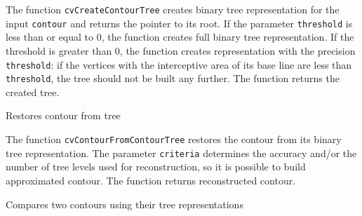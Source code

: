 
\begin{description}
\end{description}

The function \texttt{cvCreateContourTree} creates binary tree representation for the input \texttt{contour} and returns the pointer to its root. If the parameter \texttt{threshold} is less than or equal to 0, the function creates full binary tree representation. If the threshold is greater than 0, the function creates representation with the precision \texttt{threshold}: if the vertices with the interceptive area of its base line are less than \texttt{threshold}, the tree should not be built any further. The function returns the created tree.

\label{ContourFromContourTree}

Restores contour from tree


\begin{description}
\end{description}

The function \texttt{cvContourFromContourTree} restores the contour from its binary tree representation. The parameter \texttt{criteria} determines the accuracy and/or the number of tree levels used for reconstruction, so it is possible to build approximated contour. The function returns reconstructed contour.

\label{MatchContourTrees}

Compares two contours using their tree representations


